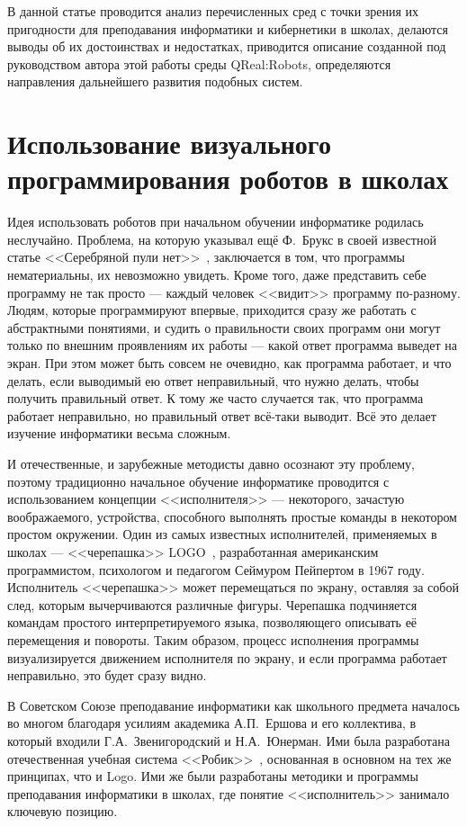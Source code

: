 \documentclass[a4paper]{article}
\begin{document}
В данной  статье проводится анализ перечисленных сред с точки зрения их пригодности для преподавания информатики и кибернетики в школах, делаются выводы об их достоинствах и недостатках, приводится описание созданной под руководством автора этой работы среды QReal:Robots, определяются направления дальнейшего развития подобных систем.

\section{Использование визуального программирования роботов в школах}
Идея использовать роботов при начальном обучении информатике родилась неслучайно. Проблема, на которую указывал ещё Ф.~Брукс в своей известной статье <<Серебряной пули нет>>~\cite{mythicalManMonth}, заключается в том, что программы нематериальны, их невозможно увидеть. Кроме того, даже представить себе программу не так просто --- каждый человек <<видит>> программу по-разному. Людям, которые программируют впервые, приходится сразу же работать с абстрактными понятиями, и судить о правильности своих программ они могут только по внешним проявлениям их работы --- какой ответ программа выведет на экран. При этом может быть совсем не очевидно, как программа работает, и что делать, если выводимый ею ответ неправильный, что нужно делать, чтобы получить правильный ответ. К тому же часто случается так, что программа работает неправильно, но правильный ответ всё-таки выводит. Всё это делает изучение информатики весьма сложным.

И отечественные, и зарубежные методисты давно осознают эту проблему, поэтому традиционно начальное обучение информатике проводится с использованием концепции <<исполнителя>> --- некоторого, зачастую воображаемого, устройства, способного выполнять простые команды в некотором простом окружении. Один из самых известных исполнителей, применяемых в школах --- <<черепашка>> LOGO~\cite{logo}, разработанная американским программистом, психологом и педагогом Сеймуром Пейпертом в 1967 году. Исполнитель <<черепашка>> может перемещаться по экрану, оставляя за собой след, которым вычерчиваются различные фигуры. Черепашка подчиняется командам простого интерпретируемого языка, позволяющего описывать её перемещения и повороты. Таким образом, процесс исполнения программы визуализируется движением исполнителя по экрану, и если программа работает неправильно, это будет сразу видно. 

В Советском Союзе преподавание информатики как школьного предмета началось во многом благодаря усилиям академика А.П.~Ершова и его коллектива, в который входили Г.А.~Звенигородский и Н.А.~Юнерман. Ими была разработана отечественная учебная система <<Робик>>~\cite{robik}, основанная в основном на тех же принципах, что и Logo. Ими же были разработаны методики и программы преподавания информатики в школах, где понятие <<исполнитель>> занимало ключевую позицию.
\end{document}
